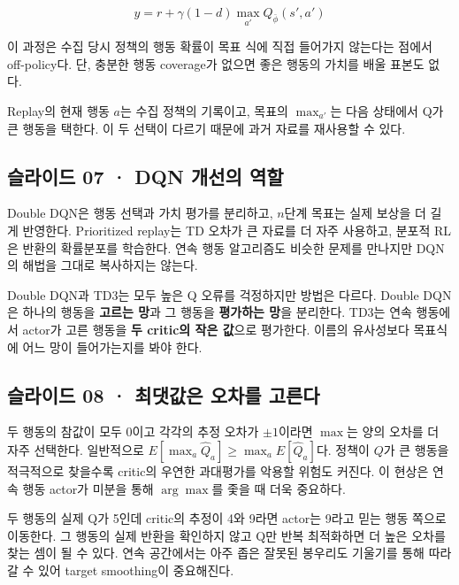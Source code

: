 \documentclass[11pt,a4paper]{article}
\begin{document}
\[
y=r+\gamma(1-d)\max_{a'}Q_{\bar\phi}(s',a')
\]

이 과정은 수집 당시 정책의 행동 확률이 목표 식에 직접 들어가지 않는다는 점에서 off-policy다. 단, 충분한 행동 coverage가 없으면 좋은 행동의 가치를 배울 표본도 없다.\par

Replay의 현재 행동 $a$는 수집 정책의 기록이고, 목표의 $\max_{a'}$는 다음 상태에서 Q가 큰 행동을 택한다. 이 두 선택이 다르기 때문에 과거 자료를 재사용할 수 있다.\par

\subsection{슬라이드 07 · DQN 개선의 역할}

Double DQN은 행동 선택과 가치 평가를 분리하고, $n$단계 목표는 실제 보상을 더 길게 반영한다. Prioritized replay는 TD 오차가 큰 자료를 더 자주 사용하고, 분포적 RL은 반환의 확률분포를 학습한다. 연속 행동 알고리즘도 비슷한 문제를 만나지만 DQN의 해법을 그대로 복사하지는 않는다.\par

Double DQN과 TD3는 모두 높은 Q 오류를 걱정하지만 방법은 다르다. Double DQN은 하나의 행동을 \textbf{고르는 망}과 그 행동을 \textbf{평가하는 망}을 분리한다. TD3는 연속 행동에서 actor가 고른 행동을 \textbf{두 critic의 작은 값}으로 평가한다. 이름의 유사성보다 목표식에 어느 망이 들어가는지를 봐야 한다.\par

\subsection{슬라이드 08 · 최댓값은 오차를 고른다}

두 행동의 참값이 모두 0이고 각각의 추정 오차가 $\pm1$이라면 $\max$는 양의 오차를 더 자주 선택한다. 일반적으로 $E[\max_a\widehat Q_a]\ge\max_aE[\widehat Q_a]$다. 정책이 $Q$가 큰 행동을 적극적으로 찾을수록 critic의 우연한 과대평가를 악용할 위험도 커진다. 이 현상은 연속 행동 actor가 미분을 통해 $\arg\max$를 좇을 때 더욱 중요하다.\par

두 행동의 실제 Q가 5인데 critic의 추정이 4와 9라면 actor는 9라고 믿는 행동 쪽으로 이동한다. 그 행동의 실제 반환을 확인하지 않고 Q만 반복 최적화하면 더 높은 오차를 찾는 셈이 될 수 있다. 연속 공간에서는 아주 좁은 잘못된 봉우리도 기울기를 통해 따라갈 수 있어 target smoothing이 중요해진다.\par
\end{document}

